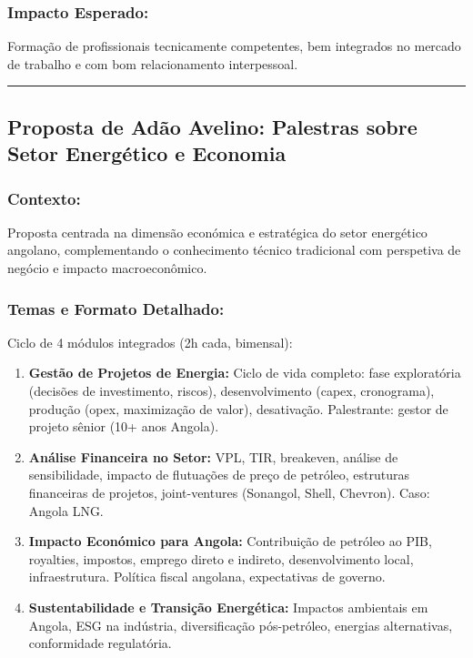 \documentclass[12pt,a4paper]{article}
\begin{document}
\subsubsection*{Impacto Esperado:}
Formação de profissionais tecnicamente competentes, bem integrados no mercado de trabalho e com bom relacionamento interpessoal.

\textcolor{spe-secondary}{\hspace{0.5cm}\rule{0.4\linewidth}{0.8pt}}
\subsection{Proposta de Adão Avelino: Palestras sobre Setor Energético e Economia}

\subsubsection*{Contexto:}
Proposta centrada na dimensão económica e estratégica do setor energético angolano, complementando o conhecimento técnico tradicional com perspetiva de negócio e impacto macroeconômico.

\subsubsection*{Temas e Formato Detalhado:}

Ciclo de 4 módulos integrados (2h cada, bimensal):

\begin{enumerate}[itemsep=0.2cm]
    \item \textbf{Gestão de Projetos de Energia:} Ciclo de vida completo: fase exploratória (decisões de investimento, riscos), desenvolvimento (capex, cronograma), produção (opex, maximização de valor), desativação. Palestrante: gestor de projeto sênior (10+ anos Angola).
    
    \item \textbf{Análise Financeira no Setor:} VPL, TIR, breakeven, análise de sensibilidade, impacto de flutuações de preço de petróleo, estruturas financeiras de projetos, joint-ventures (Sonangol, Shell, Chevron). Caso: Angola LNG.
    
    \item \textbf{Impacto Económico para Angola:} Contribuição de petróleo ao PIB, royalties, impostos, emprego direto e indireto, desenvolvimento local, infraestrutura. Política fiscal angolana, expectativas de governo.
    
    \item \textbf{Sustentabilidade e Transição Energética:} Impactos ambientais em Angola, ESG na indústria, diversificação pós-petróleo, energias alternativas, conformidade regulatória.
\end{enumerate}
\end{document}
